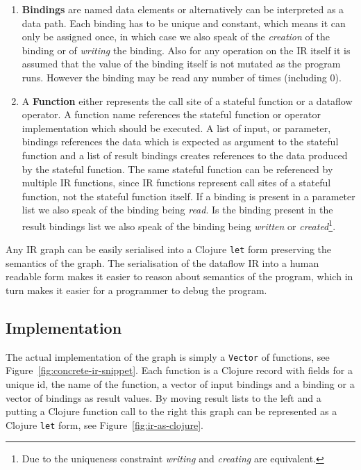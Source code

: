 \begin{enumerate}
    \item \textbf{Bindings} are named data elements or alternatively can be interpreted as a data path.
    Each binding has to be unique and constant, which means it can only be assigned once, in which case we also speak of the \textit{creation} of the binding or of \textit{writing} the binding.
    Also for any operation on the IR itself it is assumed that the value of the binding itself is not mutated as the program runs.
    However the binding may be read any number of times (including 0).
    \item A \textbf{Function} either represents the call site of a stateful function or a dataflow operator.
    A function name references the stateful function or operator implementation which should be executed.
    A list of input, or parameter, bindings references the data which is expected as argument to the stateful function and a list of result bindings creates references to the data produced by the stateful function.
    The same stateful function can be referenced by multiple IR functions, since IR functions represent call sites of a stateful function, not the stateful function itself.
    If a binding is present in a parameter list we also speak of the binding being \textit{read}.
    Is the binding present in the result bindings list we also speak of the binding being \textit{written} or \textit{created}\footnote{Due to the uniqueness constraint \textit{writing} and \textit{creating} are equivalent.}.
\end{enumerate}

Any IR graph can be easily serialised into a Clojure \texttt{let} form preserving the semantics of the graph.
The serialisation of the dataflow IR into a human readable form makes it easier to reason about semantics of the program, which in turn makes it easier for a programmer to debug the program.

\subsection{Implementation}

The actual implementation of the graph is simply a \texttt{Vector} of functions, see Figure~\ref{fig:concrete-ir-snippet}.
Each function is a Clojure record with fields for a unique id, the name of the function, a vector of input bindings and a binding or a vector of bindings as result values.
By moving result lists to the left and a putting a Clojure function call to the right this graph can be represented as a Clojure \texttt{let} form, see Figure~\ref{fig:ir-as-clojure}.

